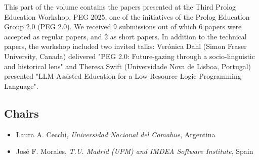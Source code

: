 \documentclass[
]{ceurart}
\begin{document}


\noindent
This part of the volume contains the papers presented at the Third Prolog Education Workshop, PEG 2025, one of the initiatives of the Prolog Education Group 2.0 (PEG 2.0). We received 9 submissions out of which 6 papers were accepted as regular papers, and 2 as short papers. In addition to the technical papers, the workshop included two invited talks: Verónica Dahl (Simon Fraser University, Canada) delivered "PEG 2.0: Future-gazing through a socio-linguistic and historical lens" and Theresa Swift (Universidade Nova de Lisboa, Portugal) presented "LLM-Assisted Education for a Low-Resource Logic Programming Language".


\subsection*{Chairs}
\begin{itemize}
  \item Laura A. Cecchi, \emph{Universidad Nacional del Comahue}, Argentina
  \item José F. Morales, \emph{T.U. Madrid (UPM) and IMDEA Software Institute}, Spain
\end{itemize}
\end{document}
